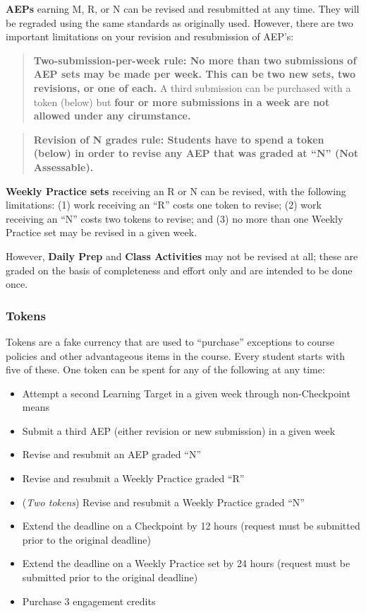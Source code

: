 \documentclass[]{article}
\providecommand{\tightlist}{%
  \setlength{\itemsep}{0pt}\setlength{\parskip}{0pt}}
\begin{document}
\textbf{AEPs} earning M, R, or N can be revised and resubmitted at any
time. They will be regraded using the same standards as originally used.
However, there are two important limitations on your revision and
resubmission of AEP's:

\begin{quote}
\textbf{Two-submission-per-week rule: No more than two submissions of
AEP sets may be made per week. This can be two new sets, two revisions,
or one of each.} A third submission can be purchased with a token
(below) but \textbf{four or more submissions in a week are not allowed
under any cirumstance.}
\end{quote}

\begin{quote}
\textbf{Revision of N grades rule: Students have to spend a token
(below) in order to revise any AEP that was graded at ``N'' (Not
Assessable).}
\end{quote}

\textbf{Weekly Practice sets} receiving an R or N can be revised, with
the following limitations: (1) work receiving an ``R'' costs one token
to revise; (2) work receiving an ``N'' costs two tokens to revise; and
(3) no more than one Weekly Practice set may be revised in a given week.

However, \textbf{Daily Prep} and \textbf{Class Activities} may not be
revised at all; these are graded on the basis of completeness and effort
only and are intended to be done once.

\hypertarget{tokens}{%
\subsubsection{Tokens}\label{tokens}}

Tokens are a fake currency that are used to ``purchase'' exceptions to
course policies and other advantageous items in the course. Every
student starts with five of these. One token can be spent for any of the
following at any time:

\begin{itemize}
\tightlist
\item
  Attempt a second Learning Target in a given week through
  non-Checkpoint means\\
\item
  Submit a third AEP (either revision or new submission) in a given week
\item
  Revise and resubmit an AEP graded ``N''
\item
  Revise and resubmit a Weekly Practice graded ``R''
\item
  (\emph{Two tokens}) Revise and resubmit a Weekly Practice graded ``N''
\item
  Extend the deadline on a Checkpoint by 12 hours (request must be
  submitted prior to the original deadline)
\item
  Extend the deadline on a Weekly Practice set by 24 hours (request must
  be submitted prior to the original deadline)
\item
  Purchase 3 engagement credits
\end{itemize}
\end{document}
